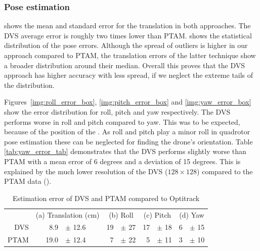 \subsubsection{Pose estimation\label{sec:poseestimationeval}}

 shows the mean and standard error
for the translation in both approaches. The DVS average error is roughly
two times lower than PTAM.  shows
the statistical distribution of the pose errors. Although the spread
of outliers is higher in our approach compared to PTAM, the translation
errors of the latter technique show a broader distribution around
their median. Overall this proves that the DVS approach has higher
accuracy with less spread, if we neglect the extreme tails of the
distribution.

Figures~\ref{img:roll_error_box}, \ref{img:pitch_error_box} and
\ref{img:yaw_error_box} show the error distribution for roll, pitch
and yaw respectively. The DVS performs worse in roll and pitch compared
to yaw. This was to be expected, because of the position of the \ALMs.
As roll and pitch play a minor roll in quadrotor pose estimation these
can be neglected for finding the drone's orientation. Table \ref{tab:yaw_error_tab}
demonstrates that the DVS performs slightly worse than PTAM with a
mean error of 6 degrees and a deviation of 15 degrees. This is explained
by the much lower resolution of the DVS ($128\times128$) compared
to the PTAM data (\xxx).

\begin{table}
\caption{\label{tab:Estimation-error}Estimation error of DVS and PTAM compared
to Optitrack}


\centering

\newcommand{\tmean}{mean\xspace}
\newcommand{\incm}{[cm]}
\newcommand{\indeg}{[$^\circ$]}
\newcommand{\tstd}{std.dev.\xspace}
\footnotesize

\begin{tabular}{r|rl|rl|rl|rl}
\multicolumn{1}{r}{} & \multicolumn{2}{c}{(a) Translation (cm)} & \multicolumn{2}{c}{(b) Roll } & \multicolumn{2}{c}{(c) Pitch} & \multicolumn{2}{c}{(d) Yaw}\tabularnewline
\cline{2-9} 
DVS\rule{0pt}{1em} & 8.9  & $\pm$ 12.6  & 19  & $\pm$ 27\textdegree{} & 17  & $\pm$ 18\textdegree{}  & 6  & $\pm$ 15\textdegree{}\tabularnewline
PTAM & 19.0 & $\pm$ 12.4  & 7  & $\pm$ 22\textdegree{} & 5  & $\pm$ 11\textdegree{}  & 3  & $\pm$ 10\textdegree{}\tabularnewline
\end{tabular}

\end{table}



